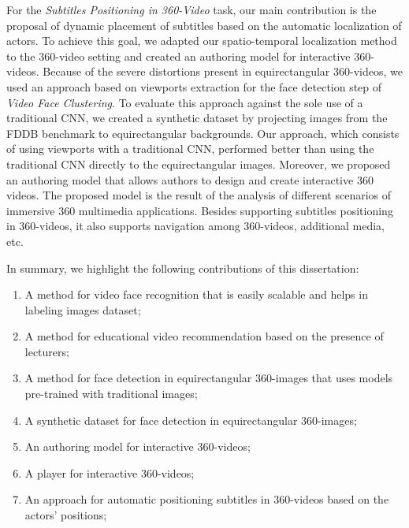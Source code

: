 For the \emph{Subtitles Positioning in 360-Video} task, our main contribution is the proposal of dynamic placement of subtitles based on the automatic localization of actors. To achieve this goal, we adapted our spatio-temporal localization method to the 360-video setting and created an authoring model for interactive 360-videos. Because of the severe distortions present in equirectangular 360-videos, we used an approach based on viewports extraction for the face detection step of \emph{Video Face Clustering}. To evaluate this approach against the sole use of a traditional CNN, we created a synthetic dataset by projecting images from the FDDB benchmark to equirectangular backgrounds. Our approach, which consists of using viewports with a traditional CNN, performed better than using the traditional CNN directly to the equirectangular images. Moreover, we proposed an authoring model that allows authors to design and create interactive 360 videos. The proposed model is the result of the analysis of different scenarios of immersive 360 multimedia applications. Besides supporting subtitles positioning in 360-videos, it also supports navigation among 360-videos, additional media, etc. 

In summary, we highlight the following contributions of this dissertation:
\begin{enumerate}
    \item A method for video face recognition that is easily scalable and helps in labeling images dataset;
    \item A method for educational video recommendation based on the presence of lecturers;
    \item A method for face detection in equirectangular 360-images that uses models pre-trained with traditional images;
    \item A synthetic dataset for face detection in equirectangular 360-images;
    \item An authoring model for interactive 360-videos;
    \item A player for interactive 360-videos;
    \item An approach for automatic positioning subtitles in 360-videos based on the actors' positions;
\end{enumerate}

